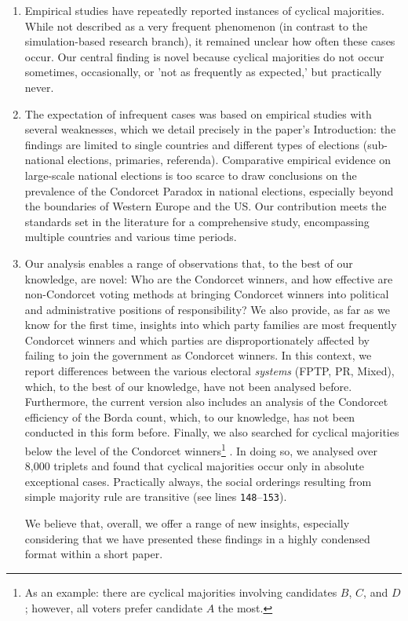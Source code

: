\documentclass[a4paper, 12pt]{scrartcl}
\begin{document}
\begin{enumerate}
\item Empirical studies have repeatedly reported instances of cyclical majorities. While not described as a very frequent phenomenon (in contrast to the simulation-based research branch), it remained unclear how often these cases occur. Our central finding is novel because cyclical majorities do not occur sometimes, occasionally, or 'not as frequently as expected,' but practically never.
%
\item The expectation of infrequent cases was based on empirical studies with several weaknesses, which we detail precisely in the paper's Introduction: the findings are limited to single countries and different types of elections (sub-national elections, primaries, referenda). Comparative empirical evidence on large-scale national elections is too scarce to draw conclusions on the prevalence of the Condorcet Paradox in national elections, especially beyond the boundaries of Western Europe and the US. Our contribution meets the standards set in the literature for a comprehensive study, encompassing multiple countries and various time periods.
%
\item Our analysis enables a range of observations that, to the best of our knowledge, are novel: Who are the Condorcet winners, and how effective are non-Condorcet voting methods at bringing Condorcet winners into political and administrative positions of responsibility? We also provide, as far as we know for the first time, insights into which party families are most frequently Condorcet winners and which parties are disproportionately affected by failing to join the government as Condorcet winners. In this context, we report differences between the various electoral \emph{systems} (FPTP, PR, Mixed), which, to the best of our knowledge, have not been analysed before. Furthermore, the current version also includes an analysis of the Condorcet efficiency of the Borda count, which, to our knowledge, has not been conducted in this form before. Finally, we also searched for cyclical majorities below the level of the Condorcet winners\footnote{
 As an example: there are cyclical majorities involving candidates $B$, $C$, and $D$; however, all voters prefer candidate $A$ the most.
} . In doing so, we analysed over 8,000 triplets and found that cyclical majorities occur only in absolute exceptional cases. Practically always, the social orderings resulting from simple majority rule are transitive (see lines \texttt{148$–$153}).

We believe that, overall, we offer a range of new insights, especially considering that we have presented these findings in a highly condensed format within a short paper.
\end{enumerate}
\end{document}
